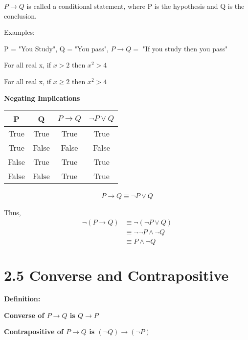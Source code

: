 \documentclass[11pt]{article}
\begin{document}
$P \rightarrow Q$ is called a conditional statement, where P is the hypothesis and Q is the conclusion.

\bigskip

Examples: 

\medskip

P = "You Study", Q = "You pass", $P \rightarrow Q = $ "If you study then you pass"

\medskip

For all real x, if $x > 2$ then $x^2 > 4$

For all real x, if $x \geq 2$ then $x^2 > 4$

\bigskip

\textbf{Negating Implications}

\begin{center}
    \begin{tabular}{ |c|c|c|c| } 
        \hline
        P & Q & $P \rightarrow Q$ & $\neg P \vee Q$ \\ 
        \hline
        True & True & True & True\\ 
        True & False & False & False\\
        False & True & True & True\\
        False & False & True & True\\ 
        \hline
    \end{tabular}
\end{center}

\begin{align*}
    P \rightarrow Q \equiv \neg P \vee Q
\end{align*}

Thus, 
\begin{align*}
    \neg(P \rightarrow Q) &\equiv \neg(\neg P \vee Q)\\
    &\equiv \neg \neg P \wedge \neg Q\\
    &\equiv P \wedge \neg Q
\end{align*}

\section*{2.5 Converse and Contrapositive}

\textbf{Definition: }

\textbf{Converse of $P \rightarrow Q$ is $Q \rightarrow P$}

\textbf{Contrapositive of $P \rightarrow Q$ is $(\neg Q) \rightarrow (\neg P)$}
\end{document}
